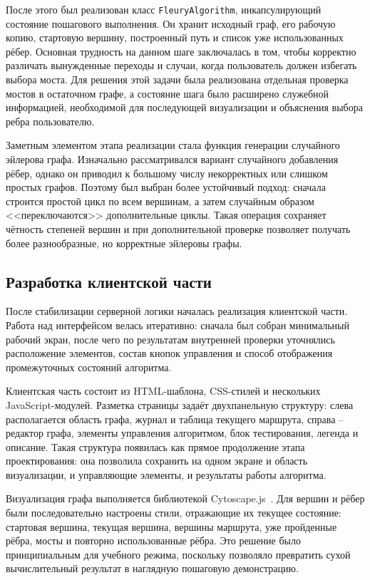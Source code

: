 \documentclass[a4paper,12pt]{extarticle}
\begin{document}
После этого был реализован класс \texttt{FleuryAlgorithm}, инкапсулирующий состояние пошагового выполнения. Он хранит исходный граф, его рабочую копию, стартовую вершину, построенный путь и список уже использованных рёбер. Основная трудность на данном шаге заключалась в том, чтобы корректно различать вынужденные переходы и случаи, когда пользователь должен избегать выбора моста. Для решения этой задачи была реализована отдельная проверка мостов в остаточном графе, а состояние шага было расширено служебной информацией, необходимой для последующей визуализации и объяснения выбора ребра пользователю.

Заметным элементом этапа реализации стала функция генерации случайного эйлерова графа. Изначально рассматривался вариант случайного добавления рёбер, однако он приводил к большому числу некорректных или слишком простых графов. Поэтому был выбран более устойчивый подход: сначала строится простой цикл по всем вершинам, а затем случайным образом <<переключаются>> дополнительные циклы. Такая операция сохраняет чётность степеней вершин и при дополнительной проверке позволяет получать более разнообразные, но корректные эйлеровы графы.

\subsection{Разработка клиентской части}

После стабилизации серверной логики началась реализация клиентской части. Работа над интерфейсом велась итеративно: сначала был собран минимальный рабочий экран, после чего по результатам внутренней проверки уточнялись расположение элементов, состав кнопок управления и способ отображения промежуточных состояний алгоритма.

Клиентская часть состоит из HTML-шаблона, CSS-стилей и нескольких JavaScript-модулей. Разметка страницы задаёт двухпанельную структуру: слева располагается область графа, журнал и таблица текущего маршрута, справа -- редактор графа, элементы управления алгоритмом, блок тестирования, легенда и описание. Такая структура появилась как прямое продолжение этапа проектирования: она позволила сохранить на одном экране и область визуализации, и управляющие элементы, и результаты работы алгоритма.

Визуализация графа выполняется библиотекой Cytoscape.js~\cite{cytoscapejs}. Для вершин и рёбер были последовательно настроены стили, отражающие их текущее состояние: стартовая вершина, текущая вершина, вершины маршрута, уже пройденные рёбра, мосты и повторно использованные рёбра. Это решение было принципиальным для учебного режима, поскольку позволяло превратить сухой вычислительный результат в наглядную пошаговую демонстрацию.
\end{document}
